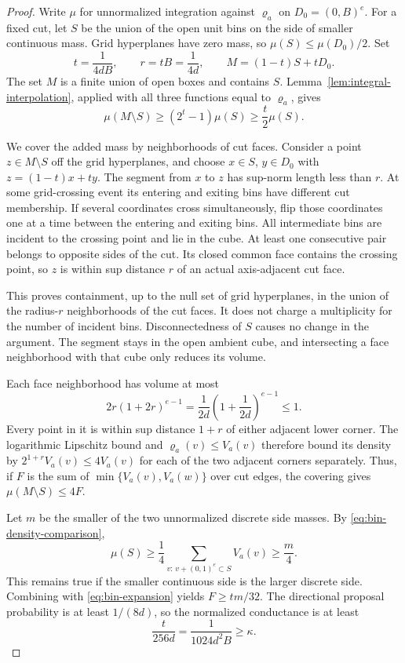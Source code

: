 \begin{proof}
Write $\mu$ for unnormalized integration against $\varrho_a$ on
$D_0=(0,B)^e$.  For a fixed cut, let $S$ be the union of the open unit
bins on the side of smaller continuous mass.  Grid hyperplanes have
zero mass, so $\mu(S)\le\mu(D_0)/2$.  Set
\[
 t=\frac{1}{4dB},\qquad r=tB=\frac{1}{4d},
 \qquad M=(1-t)S+tD_0.
\]
The set $M$ is a finite union of open boxes and contains $S$.
Lemma~\ref{lem:integral-interpolation}, applied with all three
functions equal to $\varrho_a$, gives
\begin{equation}
 \mu(M\setminus S)\ge(2^t-1)\mu(S)\ge\frac t2\mu(S).
 \label{eq:bin-expansion}
\end{equation}

We cover the added mass by neighborhoods of cut faces.  Consider a
point $z\in M\setminus S$ off the grid hyperplanes, and choose
$x\in S$, $y\in D_0$ with $z=(1-t)x+ty$.  The segment from $x$ to $z$
has sup-norm length less than $r$.  At some grid-crossing event its
entering and exiting bins have different cut membership.  If several
coordinates cross simultaneously, flip those coordinates one at a time
between the entering and exiting bins.  All intermediate bins are
incident to the crossing point and lie in the cube.  At least one
consecutive pair belongs to opposite sides of the cut.  Its closed
common face contains the crossing point, so $z$ is within sup distance
$r$ of an actual axis-adjacent cut face.

This proves containment, up to the null set of grid hyperplanes, in the
union of the radius-$r$ neighborhoods of the cut faces.  It does not
charge a multiplicity for the number of incident bins.  Disconnectedness
of $S$ causes no change in the argument.  The segment stays in the open
ambient cube, and intersecting a face neighborhood with that cube only
reduces its volume.

Each face neighborhood has volume at most
\[
 2r(1+2r)^{e-1}
 =\frac{1}{2d}\left(1+\frac{1}{2d}\right)^{e-1}\le1.
\]
Every point in it is within sup distance $1+r$ of either adjacent
lower corner.  The logarithmic Lipschitz bound and
$\varrho_a(v)\le V_a(v)$ therefore bound its density by
$2^{1+r}V_a(v)\le4V_a(v)$ for each of the two adjacent corners
separately.  Thus, if $F$ is the sum of
$\min\{V_a(v),V_a(w)\}$ over cut edges, the covering gives
$\mu(M\setminus S)\le4F$.

Let $m$ be the smaller of the two unnormalized discrete side masses.
By \eqref{eq:bin-density-comparison},
\[
 \mu(S)\ge\frac14\sum_{v:\,v+(0,1)^e\subset S}V_a(v)\ge\frac m4.
\]
This remains true if the smaller continuous side is the larger discrete
side.  Combining with \eqref{eq:bin-expansion} yields $F\ge tm/32$.
The directional proposal probability is at least $1/(8d)$, so the
normalized conductance is at least
\[
 \frac{t}{256d}=\frac{1}{1024d^2B}\ge\kappa.
\]
\end{proof}

